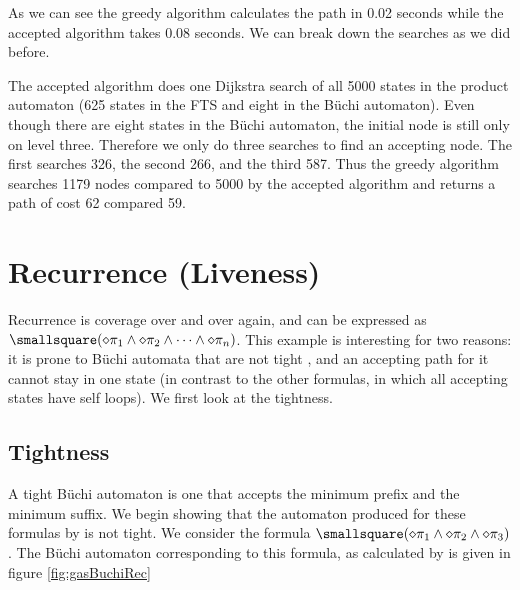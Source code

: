As we can see the greedy algorithm calculates the path in 0.02 seconds while the accepted algorithm takes 0.08 seconds. We can break down the searches as we did before. 

The accepted algorithm does one Dijkstra search of all 5000 states in the product automaton (625 states in the FTS and eight in the B\"uchi automaton). Even though there are eight states in the B\"uchi automaton, the initial node is still only on level three. Therefore we only do three searches to find an accepting node. The first searches 326, the second 266, and the third 587. Thus the greedy algorithm searches 1179 nodes compared to 5000 by the accepted algorithm and returns a path of cost 62 compared 59.

\section{Recurrence (Liveness)}
Recurrence is coverage over and over again, and can be expressed as $\smallsquare(\diamond \pi_1 \land \diamond \pi_2 \land \dots \land \diamond \pi_n)$. This example is interesting for two reasons: it is prone to B\"{u}chi automata that are not tight \cite{schuppan05}, and an accepting path for it cannot stay in one state (in contrast to the other formulas, in which all accepting states have self loops). We first look at the tightness.

\subsection{Tightness}
A tight B\"uchi automaton is one that accepts the minimum prefix and the minimum suffix. We begin showing that the automaton produced for these formulas by \cite{ltlbuchiwebsite} is not tight. We consider the formula $\smallsquare(\diamond \pi_1 \land \diamond \pi_2 \land \diamond \pi_3)$. The B\"{u}chi automaton corresponding to this formula, as calculated by \cite{gastin01} is given in figure \ref{fig:gasBuchiRec}

